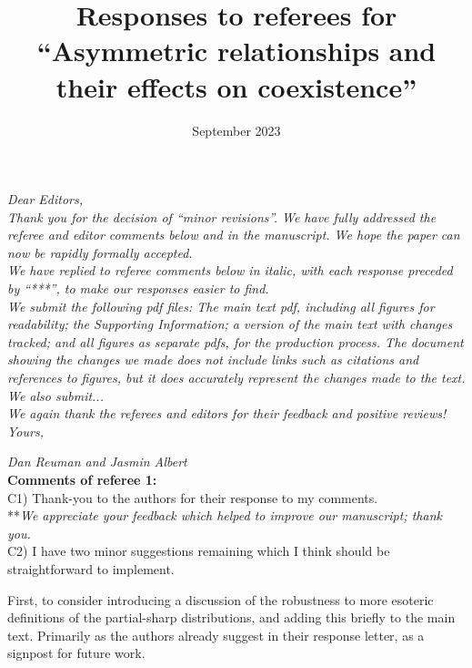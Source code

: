 \documentclass[letterpaper,11pt]{article}
\title{Responses to referees for ``Asymmetric relationships and their effects on coexistence''}
\date{September 2023}
\begin{document}
\noindent \emph{Dear Editors,} \\

\noindent \emph{Thank you for the decision of ``minor revisions''. We have 
fully addressed the referee and editor comments below and in the manuscript.
We hope the paper can now be rapidly formally accepted. } \\

\noindent \emph{We have replied to referee comments below in italic, with each response preceded
by ``***'', to make our responses easier to find.} \\

\noindent \emph{We submit the following pdf files: The main text pdf, including all figures for readability; 
the Supporting Information; a version of the main text with changes tracked; and all figures as 
separate pdfs, for the production process. The document showing 
the changes we made does not include links such as citations and
references to figures, but it does accurately represent the changes made to the text.
We also submit...
} \\

\noindent \emph{We again thank the referees and editors for their feedback and positive reviews!} \\

\noindent \emph{Yours,}

\noindent \emph{Dan Reuman and Jasmin Albert} \\


\noindent \textbf{Comments of referee 1:} \\

\noindent C1) Thank-you to the authors for their response to my comments.\\

\noindent ***\emph{We appreciate your feedback which helped to improve our manuscript; thank you.} \\

\noindent C2) I have two minor suggestions remaining which I think should be straightforward to implement.

First, to consider introducing a discussion of the robustness to more esoteric definitions of the partial-sharp distributions, and adding this briefly to the main text.  Primarily as the authors already suggest in their response letter, as a signpost for future work.\\
\end{document}
